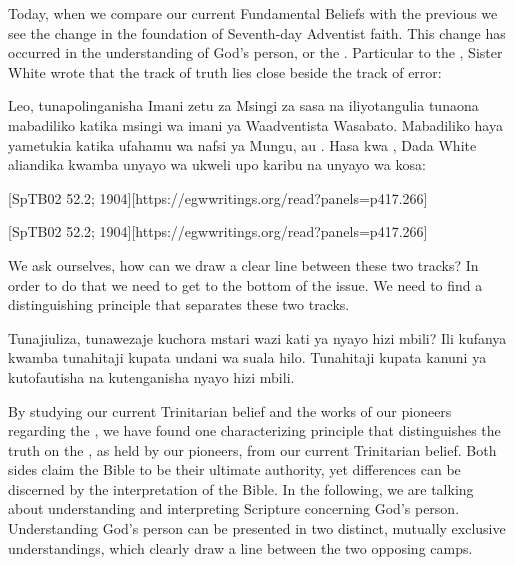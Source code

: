 



Today, when we compare our current Fundamental Beliefs with the previous  we see the change in the foundation of Seventh-day Adventist faith. This change has occurred in the understanding of God’s person, or the . Particular to the , Sister White wrote that the track of truth lies close beside the track of error:


Leo, tunapolinganisha Imani zetu za Msingi za sasa na  iliyotangulia tunaona mabadiliko katika msingi wa imani ya Waadventista Wasabato. Mabadiliko haya yametukia katika ufahamu wa nafsi ya Mungu, au . Hasa kwa , Dada White aliandika kwamba unyayo wa ukweli upo karibu na unyayo wa kosa:


[SpTB02 52.2; 1904][https://egwwritings.org/read?panels=p417.266]


[SpTB02 52.2; 1904][https://egwwritings.org/read?panels=p417.266]


We ask ourselves, how can we draw a clear line between these two tracks? In order to do that we need to get to the bottom of the issue. We need to find a distinguishing principle that separates these two tracks.


Tunajiuliza, tunawezaje kuchora mstari wazi kati ya nyayo hizi mbili? Ili kufanya kwamba tunahitaji kupata undani wa suala hilo. Tunahitaji kupata kanuni ya kutofautisha na kutenganisha nyayo hizi mbili.


By studying our current Trinitarian belief and the works of our pioneers regarding the , we have found one characterizing principle that distinguishes the truth on the , as held by our pioneers, from our current Trinitarian belief. Both sides claim the Bible to be their ultimate authority, yet differences can be discerned by the interpretation of the Bible. In the following, we are talking about understanding and interpreting Scripture concerning God’s person. Understanding God’s person can be presented in two distinct, mutually exclusive understandings, which clearly draw a line between the two opposing camps.


